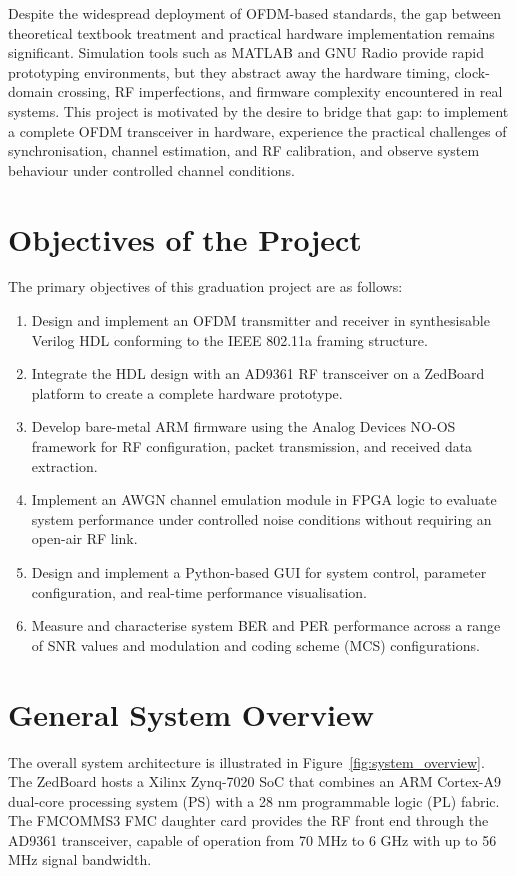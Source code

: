 \documentclass[12pt, a4paper, oneside]{report}
\begin{document}
Despite the widespread deployment of OFDM-based standards, the gap between theoretical textbook treatment and practical hardware implementation remains significant. Simulation tools such as MATLAB and GNU Radio provide rapid prototyping environments, but they abstract away the hardware timing, clock-domain crossing, RF imperfections, and firmware complexity encountered in real systems. This project is motivated by the desire to bridge that gap: to implement a complete OFDM transceiver in hardware, experience the practical challenges of synchronisation, channel estimation, and RF calibration, and observe system behaviour under controlled channel conditions.

\section{Objectives of the Project}

The primary objectives of this graduation project are as follows:

\begin{enumerate}[noitemsep]
  \item Design and implement an OFDM transmitter and receiver in synthesisable Verilog HDL conforming to the IEEE 802.11a framing structure.
  \item Integrate the HDL design with an AD9361 RF transceiver on a ZedBoard platform to create a complete hardware prototype.
  \item Develop bare-metal ARM firmware using the Analog Devices NO-OS framework for RF configuration, packet transmission, and received data extraction.
  \item Implement an AWGN channel emulation module in FPGA logic to evaluate system performance under controlled noise conditions without requiring an open-air RF link.
  \item Design and implement a Python-based GUI for system control, parameter configuration, and real-time performance visualisation.
  \item Measure and characterise system BER and PER performance across a range of SNR values and modulation and coding scheme (MCS) configurations.
\end{enumerate}

\section{General System Overview}

The overall system architecture is illustrated in Figure~\ref{fig:system_overview}. The ZedBoard hosts a Xilinx Zynq-7020 SoC that combines an ARM Cortex-A9 dual-core processing system (PS) with a 28 nm programmable logic (PL) fabric. The FMCOMMS3 FMC daughter card provides the RF front end through the AD9361 transceiver, capable of operation from 70 MHz to 6 GHz with up to 56 MHz signal bandwidth.
\end{document}
